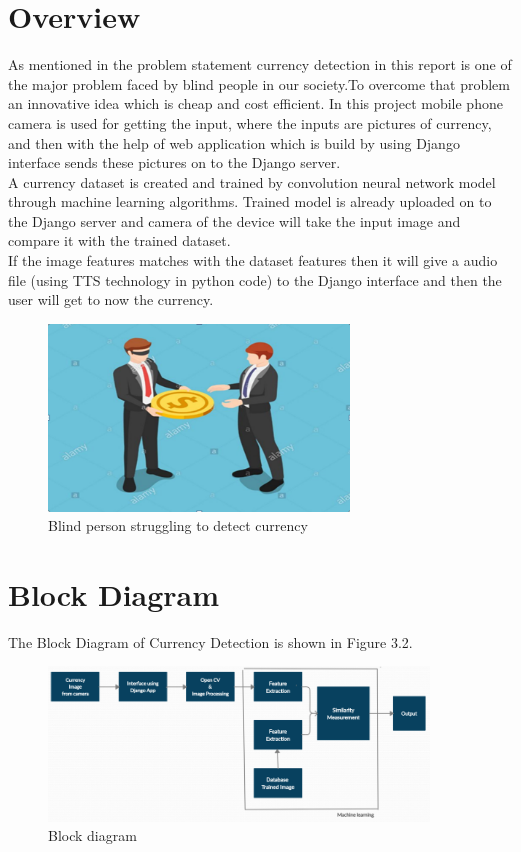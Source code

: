 \section{Overview}
As mentioned in the problem statement currency detection in this report is one of the major problem faced by blind people in our society.To overcome that problem an innovative idea which is cheap and cost efficient. In this project mobile phone camera is used for getting the input, where the inputs are pictures of currency, and then with the help of web application which is build by using Django interface sends these pictures on to the Django server. \\ A currency dataset is created and trained by convolution neural network model through machine learning algorithms. Trained model is already uploaded on to the Django server and camera of the device will take the input image and compare it with the trained dataset.\\
If the image features matches with the dataset features then it will give a audio file (using TTS technology in python code) to the Django interface and then the user will get to now the currency. 
\begin{figure}[h!]
	\centering
	\includegraphics[width=80mm]{CHAPTERS/c1.PNG}
	\caption{Blind person struggling to detect currency}
\end{figure}
\newpage
\section{Block Diagram}
The Block Diagram of Currency Detection is shown in Figure 3.2.
\begin{figure}[h!]
    \centering
    \includegraphics[width=0.9\textwidth]{CHAPTERS/c2.PNG}
    \caption{Block diagram}
\end{figure}
